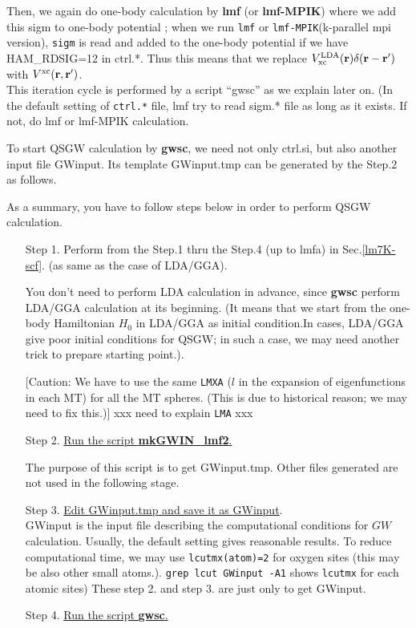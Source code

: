\documentclass[a4paper,10pt,epsf,fleqn]{article}
\newcommand{\GW}{$GW$}
\newcommand{\bfr}{{\bf r}}
\newcommand{\exe}[1]{{\bf #1}}
\newcommand{\io}[1]{{\sf  #1}}
\begin{document}
Then, we again do one-body calculation by \exe{lmf} (or \exe{lmf-MPIK})
where we add this sigm to one-body potential ;
when we run \verb#lmf# or \verb#lmf-MPIK#(k-parallel mpi version),
\verb#sigm# is read and added to the one-body potential 
if we have \io{HAM\_RDSIG=12} in \io{ctrl.*}.
Thus this means that
we replace $V_{\rm xc}^{\rm LDA}(\bfr)\delta(\bfr-\bfr')$ 
with $V^{\rm xc}(\bfr,\bfr')$.\\

This iteration cycle is performed by a script ``gwsc'' as we
explain later on. (In the default setting of \verb+ctrl.*+ file, lmf try
to read sigm.* file as long as it exists. If not, do lmf or lmf-MPIK calculation.

To start QSGW calculation by \exe{gwsc},
we need not only \io{ctrl.si}, but also another input file \io{GWinput}.
Its template \io{GWinput.tmp} can be generated by the Step.2 as follows.

As a summary, you have to follow steps below in order to perform QSGW calculation.
\begin{enumerate}
\item[Step 1.] 
Perform from the Step.1 thru the Step.4 (up to lmfa) in Sec.\ref{lm7K-scf}.
(as same as the case of LDA/GGA).

You don't need to perform LDA calculation in advance,
since \exe{gwsc} perform LDA/GGA calculation at its beginning.
(It means that we start from the one-body Hamiltonian $H_0$ in LDA/GGA as initial condition.In cases, LDA/GGA give poor initial conditions for QSGW; in such a case,
we may need another trick to prepare starting point.).

[Caution: We have to use the same \verb#LMXA# ($l$ in the expansion of eigenfunctions 
in each MT) for all the MT spheres. (This is due to historical reason;
we may need to fix this.)]
xxx need to explain \verb#LMA# xxx

\item[Step 2.]\underline{Run the script \exe{mkGWIN\_lmf2}.}

The purpose of this script is to get \io{GWinput.tmp}.
Other files generated are not used in the following stage.

\item[Step 3.]\underline{Edit \io{GWinput.tmp} and save it as \io{GWinput}}.\\
\io{GWinput} is the input file describing the computational 
conditions for \GW calculation. 
Usually, the default setting gives reasonable results.
To reduce computational time, we may
use \verb#lcutmx(atom)=2# for oxygen sites 
(this may be also other small atoms.).
\verb#grep lcut GWinput -A1# shows \verb#lcutmx# for each atomic sites)
These step 2. and step 3. are just only to get \io{GWinput}.

\item[Step 4.]\underline{ Run the script \exe{gwsc}.}
\end{enumerate}
\end{document}
